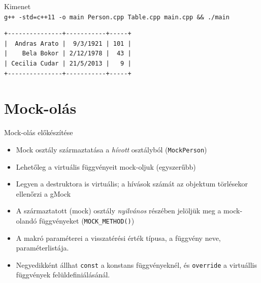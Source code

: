 \documentclass[usenames,dvipsnames,aspectratio=169]{beamer}
\begin{document}
\begin{frame}
    \begin{exampleblock}{}
        \footnotesize
        
    \end{exampleblock}
\end{frame}

\begin{frame}
    \begin{exampleblock}{}
        \footnotesize
        
    \end{exampleblock}
\end{frame}

\begin{frame}
    \begin{exampleblock}{}
        \small
        
    \end{exampleblock}
\end{frame}

\begin{frame}[fragile]
    \begin{block}{Kimenet \\ \texttt{g++ -std=c++11 -o main Person.cpp Table.cpp main.cpp \&\& ./main}}
        \begin{verbatim}
+---------------+-----------+-----+
|  Andras Arato |  9/3/1921 | 101 |
|    Bela Bokor | 2/12/1978 |  43 |
| Cecilia Cudar | 21/5/2013 |   9 |
+---------------+-----------+-----+
\end{verbatim}
    \end{block}
\end{frame}

\section{Mock-olás}

\begin{frame}
    Mock-olás előkészítése
    \begin{itemize}
        \item Mock osztály származtatása a \emph{hívott} osztályból (\texttt{MockPerson})
        \item Lehetőleg a virtuális függvényeit mock-oljuk (egyszerűbb)
        \item Legyen a destruktora is virtuális; a hívások számát az objektum törlésekor ellenőrzi a gMock
        \item A származtatott (mock) osztály \emph{nyilvános} részében jelöljük meg a mock-olandó függvényeket (\texttt{MOCK\_METHOD()})
        \item A makró paraméterei a visszatérési érték típusa, a függvény neve, paraméterlistája.
        \item Negyedikként állhat \texttt{const} a konstans függvényeknél, és \texttt{override} a virtuállis függvények felüldefiniálásánál.
    \end{itemize}
\end{frame}
\end{document}
